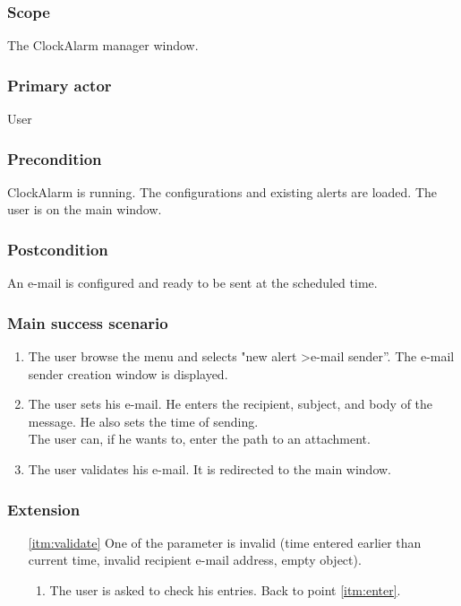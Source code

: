 \subsubsection{Scope}
The ClockAlarm manager window.
\subsubsection{Primary actor}
User
\subsubsection{Precondition}
ClockAlarm is running. The configurations and existing alerts are loaded. The user is on the main window.
\subsubsection{Postcondition}
An e-mail is configured and ready to be sent at the scheduled time.
\subsubsection{Main success scenario}
\begin{enumerate}
	\item The user browse the menu and selects "new alert \textgreater e-mail sender''. The e-mail sender creation window is displayed. 
	\item \label{itm:enter} The user sets his e-mail. He enters the recipient, subject, and body of the message. He also sets the time of sending. \\The user can, if he wants to, enter the path to an attachment.
	\item \label{itm:validate} The user validates his e-mail. It is redirected to the main window.
\end{enumerate}
\subsubsection{Extension}
\begin{enumerate}
	\item[\ref{itm:validate}] One of the parameter is invalid (time entered earlier than current time, invalid recipient e-mail address, empty object).
	\begin{enumerate}[i]
		\item The user is asked to check his entries. Back to point \ref{itm:enter}.
	\end{enumerate}
\end{enumerate}
